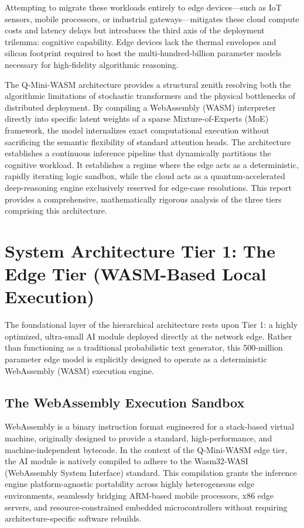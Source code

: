 \documentclass[11pt,a4paper]{article}
\begin{document}
Attempting to migrate these workloads entirely to edge devices---such as IoT sensors, mobile processors, or industrial gateways---mitigates these cloud compute costs and latency delays but introduces the third axis of the deployment trilemma: cognitive capability. Edge devices lack the thermal envelopes and silicon footprint required to host the multi-hundred-billion parameter models necessary for high-fidelity algorithmic reasoning.

The Q-Mini-WASM architecture provides a structural zenith resolving both the algorithmic limitations of stochastic transformers and the physical bottlenecks of distributed deployment. By compiling a WebAssembly (WASM) interpreter directly into specific latent weights of a sparse Mixture-of-Experts (MoE) framework, the model internalizes exact computational execution without sacrificing the semantic flexibility of standard attention heads. The architecture establishes a continuous inference pipeline that dynamically partitions the cognitive workload. It establishes a regime where the edge acts as a deterministic, rapidly iterating logic sandbox, while the cloud acts as a quantum-accelerated deep-reasoning engine exclusively reserved for edge-case resolutions. This report provides a comprehensive, mathematically rigorous analysis of the three tiers comprising this architecture.

\section{System Architecture Tier 1: The Edge Tier (WASM-Based Local Execution)}

The foundational layer of the hierarchical architecture rests upon Tier 1: a highly optimized, ultra-small AI module deployed directly at the network edge. Rather than functioning as a traditional probabilistic text generator, this 500-million parameter edge model is explicitly designed to operate as a deterministic WebAssembly (WASM) execution engine.

\subsection{The WebAssembly Execution Sandbox}

WebAssembly is a binary instruction format engineered for a stack-based virtual machine, originally designed to provide a standard, high-performance, and machine-independent bytecode. In the context of the Q-Mini-WASM edge tier, the AI module is natively compiled to adhere to the Wasm32-WASI (WebAssembly System Interface) standard. This compilation grants the inference engine platform-agnostic portability across highly heterogeneous edge environments, seamlessly bridging ARM-based mobile processors, x86 edge servers, and resource-constrained embedded microcontrollers without requiring architecture-specific software rebuilds.
\end{document}
